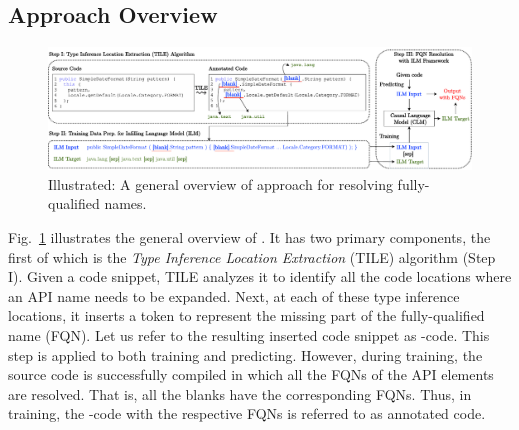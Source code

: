 \subsection{Approach Overview}
\label{sec:overview}

\begin{figure}[t]
 \centering
 \includegraphics[width=.98\textwidth]{overview-ilm-2.pdf}
 \caption{Illustrated: A general overview of \tool approach for resolving fully-qualified names.}
 \label{fig:approach}
\end{figure}


Fig.~\ref{fig:approach} illustrates the general overview of
{\tool}. It has two primary components, the first of which is the {\em
  Type Inference Location Extraction} (TILE) algorithm (Step I). Given
a code snippet, TILE analyzes it to identify all the code locations
where an API name needs to be expanded. Next, at each of these type
inference locations, it inserts a \code{[blank]} token to represent
the missing part of the fully-qualified name (FQN). Let us refer to
the resulting \code{[blank]} inserted code snippet as
\code{[blank]}-code. This step is applied to both training and
predicting. However, during training, the source code is successfully
compiled in which all the FQNs of the API elements are resolved. That
is, all the blanks have the corresponding FQNs. Thus, in training, the
\code{[blank]}-code with the respective FQNs is referred to as
annotated code.


